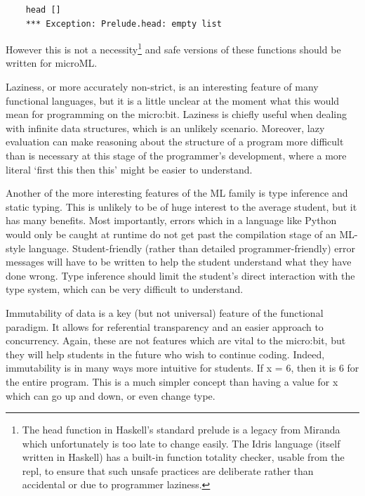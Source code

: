 \documentclass[12pt, a4paper]{report}
\begin{document}
\begin{verbatim}
    head []
    *** Exception: Prelude.head: empty list
\end{verbatim} 

However this is not a necessity\footnote{The head function in Haskell's standard prelude is a legacy
from Miranda which unfortunately is too late to change easily. The Idris language (itself written in
Haskell) has a built-in function \gls{totality} checker, usable from the repl, to ensure that such unsafe
practices are deliberate rather than accidental or due to programmer laziness.} and safe versions of
these functions should be written for microML\@.

Laziness, or more accurately non-\gls{strict}, is an interesting feature of many functional languages, 
but it is a little unclear at the moment what this would mean for programming on the micro:bit. 
Laziness is chiefly useful when dealing with infinite data structures, which is an unlikely
scenario. Moreover, lazy evaluation can make reasoning about the structure of a program more
difficult than is necessary at this stage of the programmer's development, where a more literal
`first this then this' might be easier to understand. 

Another of the more interesting features of the ML family is type inference and static typing.
This is unlikely to be of huge interest to the average student, but it has many benefits. Most
importantly, errors which in a language like Python would only be caught at runtime do not get
past the compilation stage of an ML-style language. Student-friendly (rather than detailed
programmer-friendly) error messages will have to be written to help the student understand what they
have done wrong. Type inference should limit the student's direct interaction with the type system,
which can be very difficult to understand.

Immutability of data is a key (but not universal) feature of the functional paradigm. It allows for
referential transparency and an easier approach to concurrency. Again, these are not features which
are vital to the micro:bit, but they will help students in the future who wish to continue 
coding. Indeed, immutability is in many ways more intuitive for students. If x = 6, then it is 6 for
the entire program. This is a much simpler concept than having a value for x which can go up and down,
or even change type.
\end{document}
